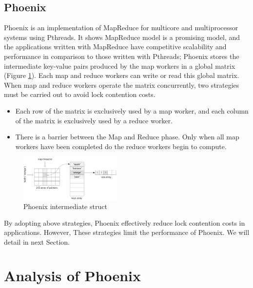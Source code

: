 \subsection{Phoenix}
Phoenix is an implementation of MapReduce for multicore  and multiprocessor systems using Pthreads.
It shows MapReduce model is a promising model, and the applications written with MapReduce have competitive scalability and performance in comparison to those written with Pthreads\cite{ranger2007phoenix};
Phoenix stores the intermediate key-value pairs produced 
by the map workers in a global matrix (Figure \ref{fig:phoenix:intermediate}). 
Each map and reduce workers can write or read this global matrix. 
When map and reduce workers operate the matrix concurrently,
two strategies must be carried out to avoid lock contention costs.
\begin{itemize}
	\item Each row of the matrix is exclusively used by a map worker, and each column of the matrix is exclusively used by a reduce worker. 
	\item There is a barrier between the Map and Reduce phase. Only when all map workers have been completed do the reduce workers begin to compute. 
\end{itemize}

\begin{figure}[!h!t]  
    \centering
    \includegraphics[width=0.45\textwidth]{eps/phoenix_intermediate.eps}
    \caption{Phoenix intermediate struct}
    \label{fig:phoenix:intermediate}
\end{figure}

By adopting above strategies, Phoenix effectively reduce lock contention costs in applications. 
However, These strategies limit the performance of Phoenix.
We will detail in next Section. 

\section{Analysis of Phoenix}

